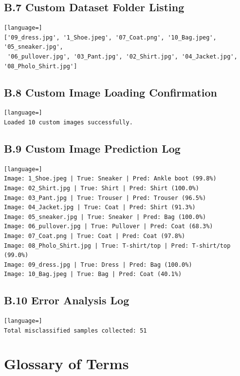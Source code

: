 \documentclass[12pt,a4paper]{report}
\begin{document}
\section*{B.7 Custom Dataset Folder Listing}
\begin{lstlisting}[language=]
['09_dress.jpg', '1_Shoe.jpeg', '07_Coat.png', '10_Bag.jpeg', '05_sneaker.jpg',
 '06_pullover.jpg', '03_Pant.jpg', '02_Shirt.jpg', '04_Jacket.jpg', '08_Pholo_Shirt.jpg']
\end{lstlisting}

\section*{B.8 Custom Image Loading Confirmation}
\begin{lstlisting}[language=]
Loaded 10 custom images successfully.
\end{lstlisting}

\section*{B.9 Custom Image Prediction Log}
\begin{lstlisting}[language=]
Image: 1_Shoe.jpeg | True: Sneaker | Pred: Ankle boot (99.8%)
Image: 02_Shirt.jpg | True: Shirt | Pred: Shirt (100.0%)
Image: 03_Pant.jpg | True: Trouser | Pred: Trouser (96.5%)
Image: 04_Jacket.jpg | True: Coat | Pred: Shirt (91.3%)
Image: 05_sneaker.jpg | True: Sneaker | Pred: Bag (100.0%)
Image: 06_pullover.jpg | True: Pullover | Pred: Coat (68.3%)
Image: 07_Coat.png | True: Coat | Pred: Coat (97.8%)
Image: 08_Pholo_Shirt.jpg | True: T-shirt/top | Pred: T-shirt/top (99.0%)
Image: 09_dress.jpg | True: Dress | Pred: Bag (100.0%)
Image: 10_Bag.jpeg | True: Bag | Pred: Coat (40.1%)
\end{lstlisting}

\section*{B.10 Error Analysis Log}
\begin{lstlisting}[language=]
Total misclassified samples collected: 51
\end{lstlisting}

\chapter{Glossary of Terms}
\end{document}
